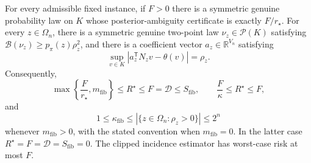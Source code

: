 For every admissible fixed instance, if \(F>0\) there is a symmetric genuine probability law on \(K\) whose posterior-ambiguity certificate is exactly \(F/r_{\star}\). For every \(z\in\Omega_n\), there is a symmetric genuine two-point law \(\nu_z\in\mathcal P(K)\) satisfying \(\mathcal B(\nu_z)\ge p_{\pi}(z)\rho_z^2\), and there is a coefficient vector \(a_z\in\mathbb R^{V_n}\) satisfying
\[
 \sup_{v\in K}\left\lvert a_z^{\mathsf T}N_zv-\theta(v)\right\rvert=\rho_z.
\]
Consequently,
\[
 \max\left\{\frac{F}{r_{\star}},m_{\mathrm{fib}}\right\}
 \le R^{\star}\le F=\mathcal D\le S_{\mathrm{fib}},
 \qquad
 \frac{F}{\kappa}\le R^{\star}\le F,
\]
and
\[
 1\le\kappa_{\mathrm{fib}}
 \le\left\lvert\{z\in\Omega_n:\rho_z>0\}\right\rvert
 \le 2^n
\]
whenever \(m_{\mathrm{fib}}>0\), with the stated convention when \(m_{\mathrm{fib}}=0\). In the latter case \(R^{\star}=F=\mathcal D=S_{\mathrm{fib}}=0\). The clipped incidence estimator has worst-case risk at most \(F\).